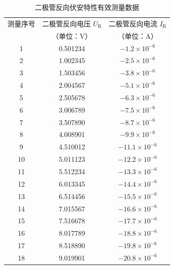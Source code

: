 \documentclass[11pt]{article}
\begin{document}
\begin{table}[htbp]
  \centering
  \caption{二极管反向伏安特性有效测量数据}
  \label{tab:diode_reverse_voltamp}  %
  \begin{threeparttable}
    \begin{tabular}{c c c}
      \toprule
      测量序号 & 二极管反向电压 $U_{\text{R}}$ & 二极管反向电流 $I_{\text{R}}$ \\
      & （单位：$\text{V}$） & （单位：$\text{A}$） \\
      \midrule
      1  & 0.501234 & $-1.2 \times 10^{-6}$ \\
      2  & 1.002345 & $-2.5 \times 10^{-6}$ \\
      3  & 1.503456 & $-3.8 \times 10^{-6}$ \\
      4  & 2.004567 & $-5.1 \times 10^{-6}$ \\
      5  & 2.505678 & $-6.3 \times 10^{-6}$ \\
      6  & 3.006789 & $-7.5 \times 10^{-6}$ \\
      7  & 3.507890 & $-8.7 \times 10^{-6}$ \\
      8  & 4.008901 & $-9.9 \times 10^{-6}$ \\
      9  & 4.510012 & $-11.1 \times 10^{-6}$ \\
      10 & 5.011123 & $-12.2 \times 10^{-6}$ \\
      11 & 5.512234 & $-13.3 \times 10^{-6}$ \\
      12 & 6.013345 & $-14.4 \times 10^{-6}$ \\
      13 & 6.514456 & $-15.5 \times 10^{-6}$ \\
      14 & 7.015567 & $-16.6 \times 10^{-6}$ \\
      15 & 7.516678 & $-17.7 \times 10^{-6}$ \\
      16 & 8.017789 & $-18.8 \times 10^{-6}$ \\
      17 & 8.518890 & $-19.8 \times 10^{-6}$ \\
      18 & 9.019901 & $-20.8 \times 10^{-6}$ \\
      \bottomrule
    \end{tabular}
    

\end{threeparttable}
\end{table}
\end{document}
